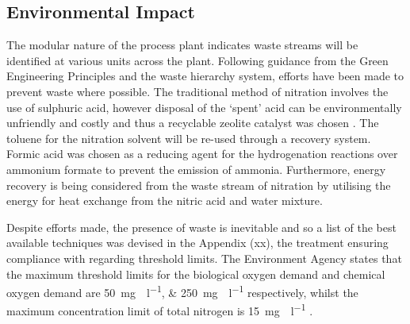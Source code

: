 \subsection{Environmental Impact}

The modular nature of the process plant indicates waste streams will be identified at various units across the plant. Following guidance from the Green Engineering Principles and the waste hierarchy system, efforts have been made to prevent waste where possible. The traditional method of nitration involves the use of sulphuric acid, however disposal of the ‘spent’ acid can be environmentally unfriendly and costly and thus a recyclable zeolite catalyst was chosen \cite{smith_superior_1996}. The toluene for the nitration solvent will be re-used through a recovery system. Formic acid was chosen as a reducing agent for the hydrogenation reactions over ammonium formate to prevent the emission of  ammonia. Furthermore, energy recovery is being considered from the waste stream of nitration by utilising the energy for heat exchange from the nitric acid and water mixture. 

Despite efforts made, the presence of waste is inevitable and so a list of the best available techniques was devised in the Appendix (xx), the treatment ensuring compliance with regarding threshold limits. The Environment Agency states that the maximum threshold limits for the biological oxygen demand and chemical oxygen demand are \SIlist{50;250}{\mg{}\per\l} respectively, whilst the maximum concentration limit of total nitrogen is \SI{15}{\mg{}\per\l} \cite{noauthor_waste_nodate}. 